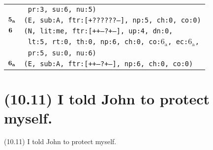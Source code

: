 \documentclass{article}
\begin{document}
\begin{minipage}{\textwidth}
{\begin{tabular}{|r|l|}
    & \texttt{\texttt{~pr:3,~su:6,~nu:5)}} \\
    ${\textbf{\textrm{5}}_{\textbf{\textrm{a}}}}$ & \texttt{\texttt{(E,~sub:A,~ftr:[+??????--],~np:5,~ch:0,~co:0)}} \\
    ${\textbf{\textrm{6}}_{\phantom{z}}}$ & \texttt{\texttt{(N,~lit:me,~ftr:[++---?+--],~up:4,~dn:0,}} \\
    & \texttt{\texttt{~lt:5,~rt:0,~th:0,~np:6,~ch:0,~co:${\textrm{6}_{\textrm{a}}}$,~ec:${\textrm{6}_{\textrm{a}}}$,}} \\
    & \texttt{\texttt{~pr:5,~su:0,~nu:6)}} \\
    ${\textbf{\textrm{6}}_{\textbf{\textrm{a}}}}$ & \texttt{\texttt{(E,~sub:A,~ftr:[++---?+--],~np:6,~ch:0,~co:0)}} \\
    \hline
  \end{tabular}
  }
\end{minipage}
\bigbreak

\clearpage

%
%

\section*{(10.11) I told John to protect myself.}

\bigbreak
\begin{enumerate*}
\item[(10.11)] I told John to protect myself.
\end{enumerate*}
\bigbreak
\end{document}
